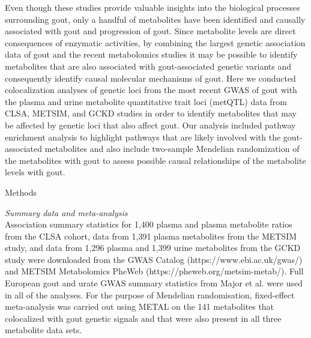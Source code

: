 \documentclass[a4paper,10pt]{article}
\begin{document}
Even though these studies provide valuable insights into the biological processes surrounding gout, only a handful of metabolites have been identified and causally associated with gout and progression of gout.
Since metabolite levels are direct consequences of enzymatic activities, by combining the largest genetic association data of gout\citep{major_genome-wide_2024} and the recent metabolomics studies\citep{chen_genomic_2023,yin_genome-wide_2022,schlosser_genetic_2023} it may be possible to identify metabolites that are also associated with gout-associated genetic variants and consequently identify causal molecular mechanisms of gout.
Here we conducted colocalization analyses of genetic loci from the most recent GWAS of gout\citep{major_genome-wide_2024} with the plasma and urine metabolite quantitative trait loci (metQTL) data from CLSA\citep{chen_genomic_2023}, METSIM\citep{yin_genome-wide_2022}, and GCKD\citep{schlosser_genetic_2023} studies in order to identify meta\-bolites that may be affected by genetic loci that also affect gout.
Our analysis included pathway enrichment analysis to highlight pathways that are likely involved with the gout-associated metabolites and also include two-sample Mendelian randomization of the metabolites with gout to assess possible causal relationships of the metabolite levels with gout.
\\

\begin{center}
	\large{Methods}
\end{center}

\noindent
\textit{Summary data and meta-analysis}\\
Association summary statistics for 1,400 plasma and plasma metabolite ratios from the CLSA cohort\citep{chen_genomic_2023}, data from 1,391 plasma metabolites from the METSIM study\citep{yin_genome-wide_2022}, and data from 1,296 plasma and 1,399 urine metabolites from the GCKD study\citep{schlosser_genetic_2023} were downloaded from the GWAS Catalog (https://www.ebi.ac.uk/gwas/) and METSIM Metabolomics PheWeb (https://pheweb.org/metsim-metab/).
Full European gout and urate GWAS summary statistics from Major et al.\citep{major_genome-wide_2024} were used in all of the analyses.
For the purpose of Mendelian randomisation, fixed-effect meta-analysis was carried out using METAL\citep{willer_metal_2010} on the 141 metabolites that colocalized with gout genetic signals and that were also present in all three metabolite data sets.
\\
\end{document}
